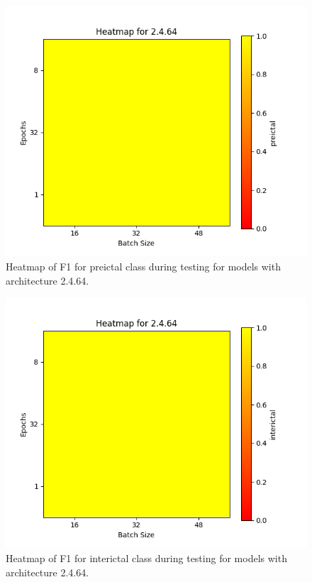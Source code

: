\documentclass[12pt]{article}
\begin{document}
\begin{figure}[H]
\includegraphics[width=\textwidth]{heatmap_f1_preictal_2.4.64}
\centering
\caption{Heatmap of F1 for preictal class during testing for models with architecture 2.4.64.}
\label{fig:time-metrics}
\end{figure}

\begin{figure}[H]
\includegraphics[width=\textwidth]{heatmap_f1_interictal_2.4.64}
\centering
\caption{Heatmap of F1 for interictal class during testing for models with architecture 2.4.64.}
\label{fig:time-metrics}
\end{figure}
\end{document}
